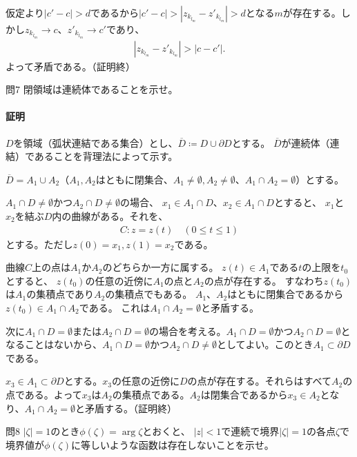 仮定より$|c'-c|>d$であるから$|c'-c|>|z_{k_{l_m}}-z'_{k_{l_m}}|>d$となる$m$が存在する。しかし$z_{k_{l_m}}\longrightarrow c$、$z'_{k_{l_m}}\longrightarrow c'$であり、
\begin{align*}
    |z_{k_{l_m}}-z'_{k_{l_m}}|>|c-c'|.
\end{align*}
よって矛盾である。（証明終）

\begin{mysimplebox}{問7}
    閉領域は連続体であることを示せ。
\end{mysimplebox}
\paragraph{証明}
$D$を領域（弧状連結である集合）とし、$\overline{D}\coloneqq D\cup\partial D$とする。
$\overline{D}$が連続体（連結）であることを背理法によって示す。

$\overline{D}=A_1\cup A_2$（$A_1, A_2$はともに閉集合、$A_1\neq\emptyset, A_2\neq\emptyset$、$A_1\cap A_2=\emptyset$）とする。

$A_1\cap D\neq\emptyset$かつ$A_2\cap D\neq\emptyset$の場合、
$x_1\in A_1\cap D$、$x_2\in A_1\cap D$とすると、
$x_1$と$x_2$を結ぶ$D$内の曲線がある。それを、
\begin{align*}
    C\colon z=z(t)\quad (0\le t \le 1)
\end{align*}
とする。ただし$z(0)=x_1, z(1)=x_2$である。

曲線$C$上の点は$A_1$か$A_2$のどちらか一方に属する。
$z(t)\in A_1$である$t$の上限を$t_0$とすると、
$z(t_0)$の任意の近傍に$A_1$の点と$A_2$の点が存在する。
すなわち$z(t_0)$は$A_1$の集積点であり$A_2$の集積点でもある。
$A_1$、$A_2$はともに閉集合であるから$z(t_0)\in A_1\cap A_2$である。
これは$A_1\cap A_2=\emptyset$と矛盾する。

次に$A_1\cap D=\emptyset$または$A_2\cap D=\emptyset$の場合を考える。$A_1\cap D=\emptyset$かつ$A_2\cap D=\emptyset$となることはないから、$A_1\cap D=\emptyset$かつ$A_2\cap D\neq\emptyset$としてよい。このとき$A_1\subset\partial D$である。

$x_3\in A_1\subset\partial D$とする。$x_3$の任意の近傍に$D$の点が存在する。それらはすべて$A_2$の点である。よって$x_3$は$A_2$の集積点である。$A_2$は閉集合であるから$x_3\in A_2$となり、$A_1\cap A_2=\emptyset$と矛盾する。（証明終）

\begin{mysimplebox}{問8}
    $|\zeta|=1$のとき$\phi(\zeta)=\arg \zeta$とおくと、
    $|z|<1$で連続で境界$|\zeta|=1$の各点$\zeta$で境界値が$\phi(\zeta)$に等しいような函数は存在しないことを示せ。
\end{mysimplebox}
